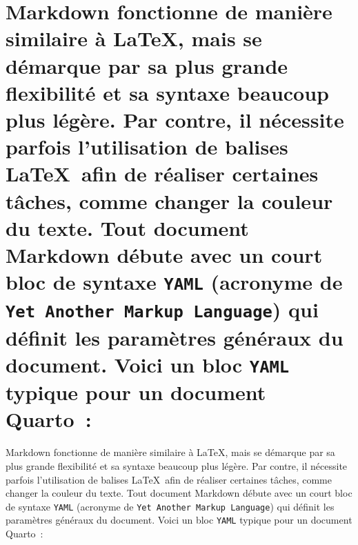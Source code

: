 \documentclass[
  letterpaper,
]{scrbook}
\begin{document}

\hypertarget{markdown-fonctionne-de-maniuxe8re-similaire-uxe0-mais-se-duxe9marque-par-sa-plus-grande-flexibilituxe9-et-sa-syntaxe-beaucoup-plus-luxe9guxe8re.-par-contre-il-nuxe9cessite-parfois-lutilisation-de-balises-afin-de-ruxe9aliser-certaines-tuxe2ches-comme-changer-la-couleur-du-texte.-tout-document-markdown-duxe9bute-avec-un-court-bloc-de-syntaxe-yaml-acronyme-de-yet-another-markup-language-qui-duxe9finit-les-paramuxe8tres-guxe9nuxe9raux-du-document.-voici-un-bloc-yaml-typique-pour-un-document-quarto}{%
\chapter{\texorpdfstring{Markdown fonctionne de manière similaire à
\LaTeX, mais se démarque par sa plus grande flexibilité et sa syntaxe
beaucoup plus légère. Par contre, il nécessite parfois l'utilisation de
balises \LaTeX~afin de réaliser certaines tâches, comme changer la
couleur du texte. Tout document Markdown débute avec un court bloc de
syntaxe \texttt{YAML} (acronyme de
\texttt{Yet\ Another\ Markup\ Language}) qui définit les paramètres
généraux du document. Voici un bloc \texttt{YAML} typique pour un
document
Quarto~:}{Markdown fonctionne de manière similaire à , mais se démarque par sa plus grande flexibilité et sa syntaxe beaucoup plus légère. Par contre, il nécessite parfois l'utilisation de balises ~afin de réaliser certaines tâches, comme changer la couleur du texte. Tout document Markdown débute avec un court bloc de syntaxe YAML (acronyme de Yet Another Markup Language) qui définit les paramètres généraux du document. Voici un bloc YAML typique pour un document Quarto~:}}\label{markdown-fonctionne-de-maniuxe8re-similaire-uxe0-mais-se-duxe9marque-par-sa-plus-grande-flexibilituxe9-et-sa-syntaxe-beaucoup-plus-luxe9guxe8re.-par-contre-il-nuxe9cessite-parfois-lutilisation-de-balises-afin-de-ruxe9aliser-certaines-tuxe2ches-comme-changer-la-couleur-du-texte.-tout-document-markdown-duxe9bute-avec-un-court-bloc-de-syntaxe-yaml-acronyme-de-yet-another-markup-language-qui-duxe9finit-les-paramuxe8tres-guxe9nuxe9raux-du-document.-voici-un-bloc-yaml-typique-pour-un-document-quarto}}

Markdown fonctionne de manière similaire à \LaTeX, mais se démarque par
sa plus grande flexibilité et sa syntaxe beaucoup plus légère. Par
contre, il nécessite parfois l'utilisation de balises \LaTeX~afin de
réaliser certaines tâches, comme changer la couleur du texte. Tout
document Markdown débute avec un court bloc de syntaxe \texttt{YAML}
(acronyme de \texttt{Yet\ Another\ Markup\ Language}) qui définit les
paramètres généraux du document. Voici un bloc \texttt{YAML} typique
pour un document Quarto~:
\end{document}
